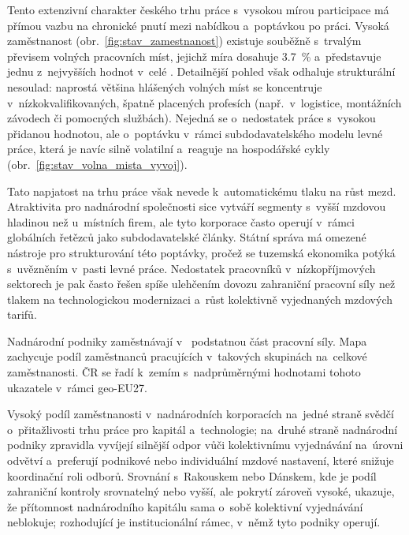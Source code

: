 Tento extenzivní charakter českého trhu práce s~vysokou mírou participace má přímou vazbu na chronické pnutí mezi nabídkou a~poptávkou po práci. Vysoká zaměstnanost (obr.~\ref{fig:stav_zamestnanost}) existuje souběžně s~trvalým převisem volných pracovních míst, jejichž míra dosahuje \SI{3,7}{\percent} a~představuje jednu z~nejvyšších hodnot v~celé . Detailnější pohled však odhaluje strukturální nesoulad: naprostá většina hlášených volných míst se koncentruje v~nízkokvalifikovaných, špatně placených profesích (např.~v~logistice, montážních závodech či pomocných službách). Nejedná se o~nedostatek práce s~vysokou přidanou hodnotou, ale o~poptávku v~rámci subdodavatelského modelu levné práce, která je navíc silně volatilní a~reaguje na hospodářské cykly (obr.~\ref{fig:stav_volna_mista_vyvoj}).\par



Tato napjatost na trhu práce však nevede k~automatickému tlaku na růst mezd. Atraktivita  pro nadnárodní společnosti sice vytváří segmenty s~vyšší mzdovou hladinou než u~místních firem, ale tyto korporace často operují v~rámci globálních řetězců jako subdodavatelské články. Státní správa má omezené nástroje pro strukturování této poptávky, pročež se tuzemská ekonomika potýká s~uvězněním v~pasti levné práce. Nedostatek pracovníků v~nízkopříjmových sektorech je pak často řešen spíše ulehčením dovozu zahraniční pracovní síly než tlakem na technologickou modernizaci a~růst kolektivně vyjednaných mzdových tarifů.\par

Nadnárodní podniky zaměstnávají v~ podstatnou část pracovní síly. Mapa zachycuje podíl zaměstnanců pracujících v~takových skupinách na~celkové zaměstnanosti. \ac{ČR} se řadí k~zemím s~nadprůměrnými hodnotami tohoto ukazatele v~rámci \acs{geo-EU27}.\par



Vysoký podíl zaměstnanosti v~nadnárodních korporacích na~jedné straně svědčí o~přitažlivosti trhu práce pro kapitál a~technologie; na~druhé straně nadnárodní podniky zpravidla vyvíjejí silnější odpor vůči kolektivnímu vyjednávání na~úrovni odvětví a~preferují podnikové nebo individuální mzdové nastavení, které snižuje koordinační roli odborů. Srovnání s~Rakouskem nebo Dánskem, kde je podíl zahraniční kontroly srovnatelný nebo vyšší, ale pokrytí  zároveň vysoké, ukazuje, že přítomnost nadnárodního kapitálu sama o~sobě kolektivní vyjednávání neblokuje; rozhodující je institucionální rámec, v~němž tyto podniky operují.\par
